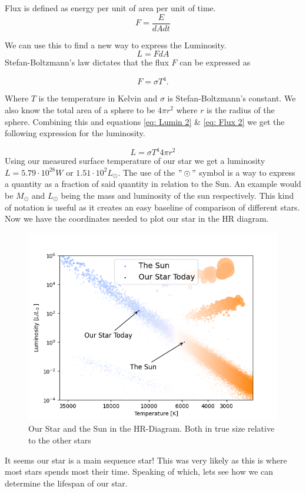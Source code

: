 \documentclass[reprint,english,notitlepage]{revtex4-2}
\begin{document}
Flux is defined as energy per unit of area per unit of time. 
\begin{equation} \label{eq: Flux}
  F = \frac{E}{dAdt}
\end{equation}

We can use this to find a new way to express the Luminosity. 
\begin{equation} \label{eq: Lumin 2}
  L = FdA 
\end{equation}
Stefan-Boltzmann's law%
dictates that the flux $ F $ can be expressed as

\begin{equation}\label{eq: Flux 2}
  F = σT^{4}.
\end{equation}

Where $ T $ is the temperature in Kelvin and $ \sigma  $ is Stefan-Boltzmann's constant. We also know the total area of a sphere to be $ 4 \pi r^{2} $  where $ r $ is the radius of the sphere. Combining this and equations \ref{eq: Lumin 2} \& \ref{eq: Flux 2} we get the following expression for the luminosity.

\begin{equation} \label{eq: Luminosity final}
  L = σT^{4} 4 π r^{2}
\end{equation}
Using our measured surface temperature of our star we get a luminosity $ L = 5.79 \cdot 10^{28} W$  or $ 1.51 \cdot 10^{2} L_{\odot} $. The use of the  $ "\odot" $ symbol is a way to express a quantity as a fraction of said quantity in relation to the Sun. An example would be $ M_{⊙} $ and $ L_{⊙} $ being the mass and luminosity of the sun respectively. This kind of notation is useful as it creates an easy baseline of comparison of different stars.
Now we have the coordinates needed to plot our star in the HR diagram. 
\begin{figure}[h!]
  \centering
  \includegraphics[scale = .5]{figures/HR_diagram_Sun and Star}
  \caption{Our Star and the Sun in the HR-Diagram. Both in true size relative to the other stars}
  \label{fig: HR_Diagram_Today}
\end{figure}
It seems our star is a main sequence star! This was very likely as this is where most stars spends most their time. Speaking of which, lets see how we can determine the lifespan of our star. 
\end{document}
